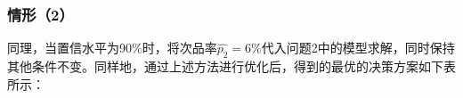 \documentclass[withoutpreface,bwprint]{cumcmthesis} %
\begin{document}
\subsubsection*{情形（2）}
同理，当置信水平为90\%时，将次品率$\hat{p_2}=6\%$代入问题2中的模型求解，同时保持其他条件不变。同样地，通过上述方法进行优化后，得到的最优的决策方案如下表所示：
\begin{table}[htbp]
			\centering
	\caption{情形（2）在问题2中的决策方案}
\end{table}
\end{document}
